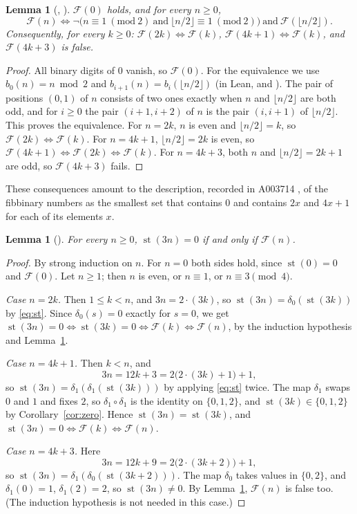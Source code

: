 \documentclass[11pt]{amsart}
\theoremstyle{plain}
\newtheorem{lemma}[theorem]{Lemma}
\theoremstyle{definition}
\newcommand{\st}{\operatorname{st}}
\newcommand{\Fib}{\mathcal{F}}
\begin{document}
\begin{lemma}[, ]\label{lem:fib}
$\Fib(0)$ holds, and for every $n\ge0$,
\[
  \Fib(n)\iff \neg\bigl(n\equiv1\ (\mathrm{mod}\ 2)\ \text{and}\ \lfloor n/2\rfloor\equiv1\ (\mathrm{mod}\ 2)\bigr)\ \text{and}\ \Fib(\lfloor n/2\rfloor).
\]
Consequently, for every $k\ge0$: $\Fib(2k)\iff\Fib(k)$, $\Fib(4k+1)\iff\Fib(k)$, and $\Fib(4k+3)$ is false.
\end{lemma}

\begin{proof}
All binary digits of $0$ vanish, so $\Fib(0)$. For the equivalence we use $b_0(n)=n\bmod2$ and $b_{i+1}(n)=b_i(\lfloor n/2\rfloor)$ (in Lean,  and ).
The pair of positions $(0,1)$ of $n$ consists of two ones exactly when $n$ and $\lfloor n/2\rfloor$ are both odd, and for $i\ge0$ the pair $(i+1,i+2)$ of $n$ is the pair $(i,i+1)$ of $\lfloor n/2\rfloor$. This proves the equivalence.
For $n=2k$, $n$ is even and $\lfloor n/2\rfloor=k$, so $\Fib(2k)\iff\Fib(k)$. For $n=4k+1$, $\lfloor n/2\rfloor=2k$ is even, so $\Fib(4k+1)\iff\Fib(2k)\iff\Fib(k)$. For $n=4k+3$, both $n$ and $\lfloor n/2\rfloor=2k+1$ are odd, so $\Fib(4k+3)$ fails.
\end{proof}

These consequences amount to the description, recorded in A003714 \cite{A003714}, of the fibbinary numbers as the smallest set that contains $0$ and contains $2x$ and $4x+1$ for each of its elements $x$.

\begin{lemma}[]\label{lem:three}
For every $n\ge0$, $\st(3n)=0$ if and only if $\Fib(n)$.
\end{lemma}

\begin{proof}
By strong induction on $n$. For $n=0$ both sides hold, since $\st(0)=0$ and $\Fib(0)$. Let $n\ge1$; then $n$ is even, or $n\equiv1$, or $n\equiv3\pmod 4$.

\emph{Case $n=2k$.} Then $1\le k<n$, and $3n=2\cdot(3k)$, so $\st(3n)=\delta_0(\st(3k))$ by \eqref{eq:st}. Since $\delta_0(s)=0$ exactly for $s=0$, we get $\st(3n)=0\iff\st(3k)=0\iff\Fib(k)\iff\Fib(n)$, by the induction hypothesis and Lemma~\ref{lem:fib}.

\emph{Case $n=4k+1$.} Then $k<n$, and
\[
  3n=12k+3=2\bigl(2\cdot(3k)+1\bigr)+1,
\]
so $\st(3n)=\delta_1(\delta_1(\st(3k)))$ by applying \eqref{eq:st} twice. The map $\delta_1$ swaps $0$ and $1$ and fixes $2$, so $\delta_1\circ\delta_1$ is the identity on $\{0,1,2\}$, and $\st(3k)\in\{0,1,2\}$ by Corollary~\ref{cor:zero}. Hence $\st(3n)=\st(3k)$, and $\st(3n)=0\iff\Fib(k)\iff\Fib(n)$.

\emph{Case $n=4k+3$.} Here
\[
  3n=12k+9=2\bigl(2\cdot(3k+2)\bigr)+1,
\]
so $\st(3n)=\delta_1(\delta_0(\st(3k+2)))$. The map $\delta_0$ takes values in $\{0,2\}$, and $\delta_1(0)=1$, $\delta_1(2)=2$, so $\st(3n)\ne0$. By Lemma~\ref{lem:fib}, $\Fib(n)$ is false too. (The induction hypothesis is not needed in this case.)
\end{proof}
\end{document}
